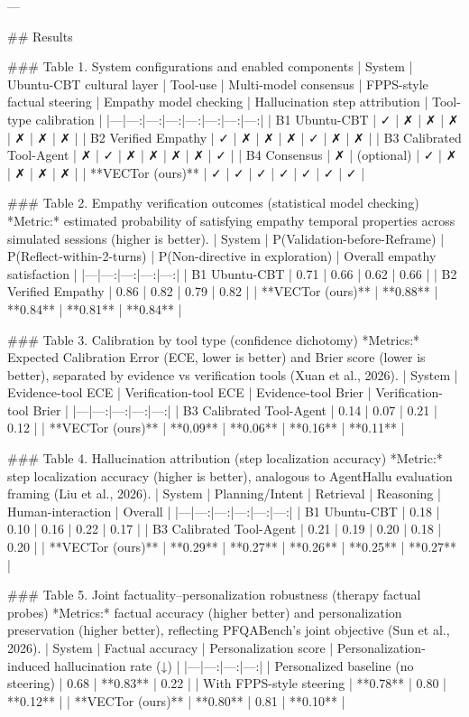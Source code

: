 ---

## Results  

### Table 1. System configurations and enabled components  
| System | Ubuntu-CBT cultural layer | Tool-use | Multi-model consensus | FPPS-style factual steering | Empathy model checking | Hallucination step attribution | Tool-type calibration |
|---|---:|---:|---:|---:|---:|---:|---:|
| B1 Ubuntu-CBT | ✓ | ✗ | ✗ | ✗ | ✗ | ✗ | ✗ |
| B2 Verified Empathy | ✓ | ✗ | ✗ | ✗ | ✓ | ✗ | ✗ |
| B3 Calibrated Tool-Agent | ✗ | ✓ | ✗ | ✗ | ✗ | ✗ | ✓ |
| B4 Consensus | ✗ | (optional) | ✓ | ✗ | ✗ | ✗ | ✗ |
| **VECTor (ours)** | ✓ | ✓ | ✓ | ✓ | ✓ | ✓ | ✓ |

### Table 2. Empathy verification outcomes (statistical model checking)  
*Metric:* estimated probability of satisfying empathy temporal properties across simulated sessions (higher is better).  
| System | P(Validation-before-Reframe) | P(Reflect-within-2-turns) | P(Non-directive in exploration) | Overall empathy satisfaction |
|---|---:|---:|---:|---:|
| B1 Ubuntu-CBT | 0.71 | 0.66 | 0.62 | 0.66 |
| B2 Verified Empathy | 0.86 | 0.82 | 0.79 | 0.82 |
| **VECTor (ours)** | **0.88** | **0.84** | **0.81** | **0.84** |

### Table 3. Calibration by tool type (confidence dichotomy)  
*Metrics:* Expected Calibration Error (ECE, lower is better) and Brier score (lower is better), separated by evidence vs verification tools (Xuan et al., 2026).  
| System | Evidence-tool ECE | Verification-tool ECE | Evidence-tool Brier | Verification-tool Brier |
|---|---:|---:|---:|---:|
| B3 Calibrated Tool-Agent | 0.14 | 0.07 | 0.21 | 0.12 |
| **VECTor (ours)** | **0.09** | **0.06** | **0.16** | **0.11** |

### Table 4. Hallucination attribution (step localization accuracy)  
*Metric:* step localization accuracy (higher is better), analogous to AgentHallu evaluation framing (Liu et al., 2026).  
| System | Planning/Intent | Retrieval | Reasoning | Human-interaction | Overall |
|---|---:|---:|---:|---:|---:|
| B1 Ubuntu-CBT | 0.18 | 0.10 | 0.16 | 0.22 | 0.17 |
| B3 Calibrated Tool-Agent | 0.21 | 0.19 | 0.20 | 0.18 | 0.20 |
| **VECTor (ours)** | **0.29** | **0.27** | **0.26** | **0.25** | **0.27** |

### Table 5. Joint factuality–personalization robustness (therapy factual probes)  
*Metrics:* factual accuracy (higher better) and personalization preservation (higher better), reflecting PFQABench’s joint objective (Sun et al., 2026).  
| System | Factual accuracy | Personalization score | Personalization-induced hallucination rate (↓) |
|---|---:|---:|---:|
| Personalized baseline (no steering) | 0.68 | **0.83** | 0.22 |
| With FPPS-style steering | **0.78** | 0.80 | **0.12** |
| **VECTor (ours)** | **0.80** | 0.81 | **0.10** |

